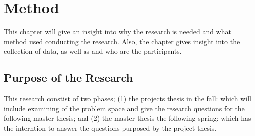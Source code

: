 
\chapter{Method}
This chapter will give an insight into why the research is needed and what method used conducting the research. Also, the chapter gives insight into the collection of data,  as well as and who are the participants.

\section{Purpose of the Research} \label{sec:purpose}


This research constist of two phases; (1) the projects thesis in the fall: which will include examining of the problem space and give the research questions for the following master thesis; and (2) the master thesis the following spring: which has the interntion to answer the questions purposed by the project thesis.

